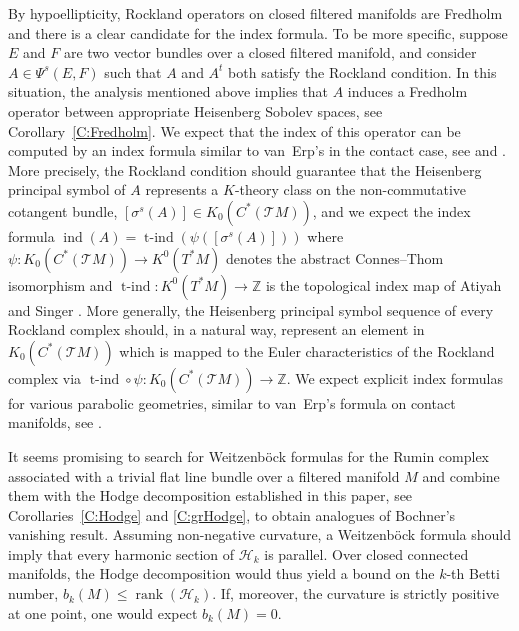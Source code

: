 \documentclass[reqno,12pt]{amsart}
\DeclareMathOperator{\ind}{ind}
\DeclareMathOperator{\tind}{t-ind}
\DeclareMathOperator{\rank}{rank}
\newcommand\Z{\mathbb Z}
\theoremstyle{plain}
\theoremstyle{definition}
\begin{document}
By hypoellipticity, Rockland operators on closed filtered manifolds are Fredholm and there is a clear candidate for the index formula.
To be more specific, suppose $E$ and $F$ are two vector bundles over a closed filtered manifold, and consider $A\in\Psi^s(E,F)$ such that $A$ and $A^t$ both satisfy the Rockland condition.
In this situation, the analysis mentioned above implies that $A$ induces a Fredholm operator between appropriate Heisenberg Sobolev spaces, see Corollary~\ref{C:Fredholm}.
We expect that the index of this operator can be computed by an index formula similar to van~Erp's in the contact case, see \cite{E10a} and \cite{C94}.
More precisely, the Rockland condition should guarantee that the Heisenberg principal symbol of $A$ represents a $K$-theory class on the non-commutative cotangent bundle, $[\sigma^s(A)]\in K_0(C^*(\mathcal TM))$, and we expect the index formula $\ind(A)=\tind(\psi([\sigma^s(A)]))$ where $\psi\colon K_0(C^*(\mathcal TM))\to K^0(T^*M)$ denotes the abstract Connes--Thom isomorphism \cite{C81} and $\tind\colon K^0(T^*M)\to\Z$ is the topological index map of Atiyah and Singer \cite{AS68}.
More generally, the Heisenberg principal symbol sequence of every Rockland complex should, in a natural way, represent an element in $K_0(C^*(\mathcal TM))$ which is mapped to the Euler characteristics of the Rockland complex via $\tind\circ\psi\colon K_0(C^*(\mathcal TM))\to\Z$.
We expect explicit index formulas for various parabolic geometries, similar to van~Erp's formula on contact manifolds, see \cite{E10b}.


It seems promising to search for Weitzenb\"ock formulas for the Rumin complex associated with a trivial flat line bundle over a filtered manifold $M$ and combine them with the Hodge decomposition established in this paper, see Corollaries~\ref{C:Hodge} and \ref{C:grHodge}, to obtain analogues of Bochner's vanishing result.
Assuming non-negative curvature, a Weitzenb\"ock formula should imply that every harmonic section of $\mathcal H_k$ is parallel.
Over closed connected manifolds, the Hodge decomposition would thus yield a bound on the $k$-th Betti number, $b_k(M)\leq\rank(\mathcal H_k)$.
If, moreover, the curvature is strictly positive at one point, one would expect $b_k(M)=0$.
\end{document}
